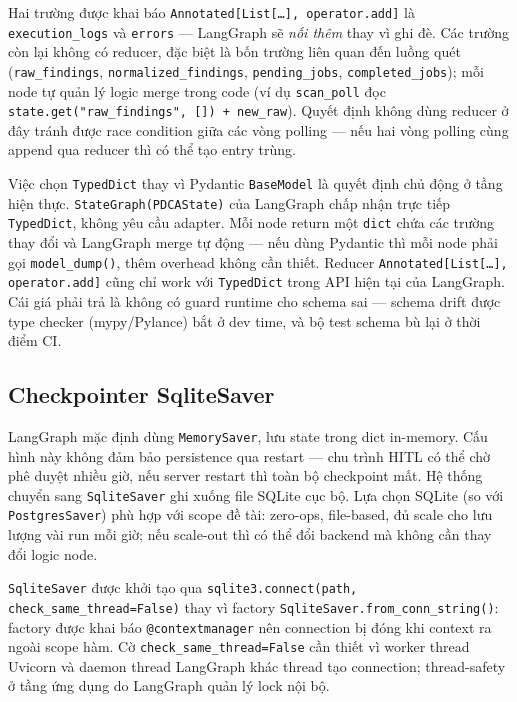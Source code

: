 Hai trường được khai báo \texttt{Annotated[List[\dots], operator.add]} là \texttt{execution\_logs} và \texttt{errors} — LangGraph sẽ \emph{nối thêm} thay vì ghi đè. Các trường còn lại không có reducer, đặc biệt là bốn trường liên quan đến luồng quét (\texttt{raw\_findings}, \texttt{normalized\_findings}, \texttt{pending\_jobs}, \texttt{completed\_jobs}); mỗi node tự quản lý logic merge trong code (ví dụ \texttt{scan\_poll} đọc \texttt{state.get("raw\_findings", []) + new\_raw}). Quyết định không dùng reducer ở đây tránh được race condition giữa các vòng polling — nếu hai vòng polling cùng append qua reducer thì có thể tạo entry trùng.

Việc chọn \texttt{TypedDict} thay vì Pydantic \texttt{BaseModel} là quyết định chủ động ở tầng hiện thực. \texttt{StateGraph(PDCAState)} của LangGraph chấp nhận trực tiếp \texttt{TypedDict}, không yêu cầu adapter. Mỗi node return một \texttt{dict} chứa các trường thay đổi và LangGraph merge tự động — nếu dùng Pydantic thì mỗi node phải gọi \texttt{model\_dump()}, thêm overhead không cần thiết. Reducer \texttt{Annotated[List[\dots], operator.add]} cũng chỉ work với \texttt{TypedDict} trong API hiện tại của LangGraph. Cái giá phải trả là không có guard runtime cho schema sai — schema drift được type checker (mypy/Pylance) bắt ở dev time, và bộ test schema bù lại ở thời điểm CI.

\subsection{Checkpointer SqliteSaver}

LangGraph mặc định dùng \texttt{MemorySaver}, lưu state trong dict in-memory. Cấu hình này không đảm bảo persistence qua restart — chu trình HITL có thể chờ phê duyệt nhiều giờ, nếu server restart thì toàn bộ checkpoint mất. Hệ thống chuyển sang \texttt{SqliteSaver} ghi xuống file SQLite cục bộ. Lựa chọn SQLite (so với \texttt{PostgresSaver}) phù hợp với scope đề tài: zero-ops, file-based, đủ scale cho lưu lượng vài run mỗi giờ; nếu scale-out thì có thể đổi backend mà không cần thay đổi logic node.

\texttt{SqliteSaver} được khởi tạo qua \texttt{sqlite3.connect(path, check\_same\_thread=False)} thay vì factory \texttt{SqliteSaver.from\_conn\_string()}: factory được khai báo \texttt{@contextmanager} nên connection bị đóng khi context ra ngoài scope hàm. Cờ \texttt{check\_same\_thread=False} cần thiết vì worker thread Uvicorn và daemon thread LangGraph khác thread tạo connection; thread-safety ở tầng ứng dụng do LangGraph quản lý lock nội bộ.

